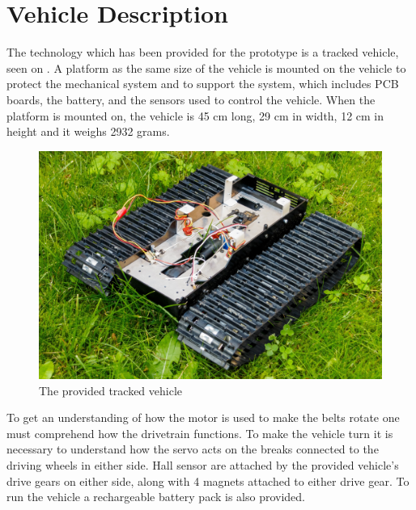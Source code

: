\section{Vehicle Description}
\label{sec:Vehicledescription}
The technology which has been provided for the prototype is a tracked vehicle, seen on . A platform as the same size of the vehicle is mounted on the vehicle to protect the mechanical system and to support the system, which includes PCB boards, the battery, and the sensors used to control the vehicle. When the platform is mounted on, the vehicle is 45 cm long, 29 cm in width, 12 cm in height and it weighs 2932 grams.\\
%
\begin{figure}[H]
	\centering
	\includegraphics[scale=0.6]{figures/BeltVehicle.jpg}
	\caption{The provided tracked vehicle}
	\label{TrackedVehicle}
\end{figure}
%
To get an understanding of how the motor is used to make the belts rotate one must comprehend how the drivetrain functions. To make the vehicle turn it is necessary to understand how the servo acts on the breaks connected to the driving wheels in either side. Hall sensor are attached by the provided vehicle's drive gears on either side, along with 4 magnets attached to either drive gear. To run the vehicle a rechargeable battery pack is also provided.